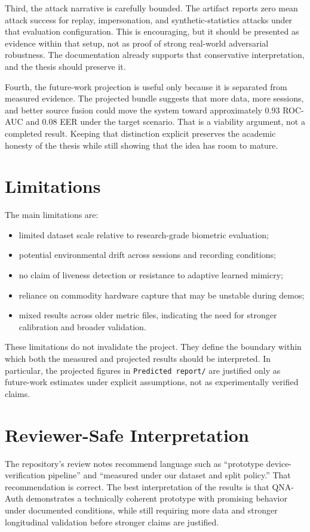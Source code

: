 \documentclass[12pt]{report}
\begin{document}
Third, the attack narrative is carefully bounded. The artifact reports zero mean attack success for replay, impersonation, and synthetic-statistics attacks under that evaluation configuration. This is encouraging, but it should be presented as evidence within that setup, not as proof of strong real-world adversarial robustness. The documentation already supports that conservative interpretation, and the thesis should preserve it.

Fourth, the future-work projection is useful only because it is separated from measured evidence. The projected bundle suggests that more data, more sessions, and better source fusion could move the system toward approximately 0.93 ROC-AUC and 0.08 EER under the target scenario. That is a viability argument, not a completed result. Keeping that distinction explicit preserves the academic honesty of the thesis while still showing that the idea has room to mature.

\section{Limitations}
The main limitations are:
\begin{itemize}[leftmargin=1.2cm]
\item limited dataset scale relative to research-grade biometric evaluation;
\item potential environmental drift across sessions and recording conditions;
\item no claim of liveness detection or resistance to adaptive learned mimicry;
\item reliance on commodity hardware capture that may be unstable during demos;
\item mixed results across older metric files, indicating the need for stronger calibration and broader validation.
\end{itemize}

These limitations do not invalidate the project. They define the boundary within which both the measured and projected results should be interpreted. In particular, the projected figures in \texttt{Predicted report/} are justified only as future-work estimates under explicit assumptions, not as experimentally verified claims.

\section{Reviewer-Safe Interpretation}
The repository's review notes recommend language such as ``prototype device-verification pipeline'' and ``measured under our dataset and split policy.'' That recommendation is correct. The best interpretation of the results is that QNA-Auth demonstrates a technically coherent prototype with promising behavior under documented conditions, while still requiring more data and stronger longitudinal validation before stronger claims are justified.
\end{document}

